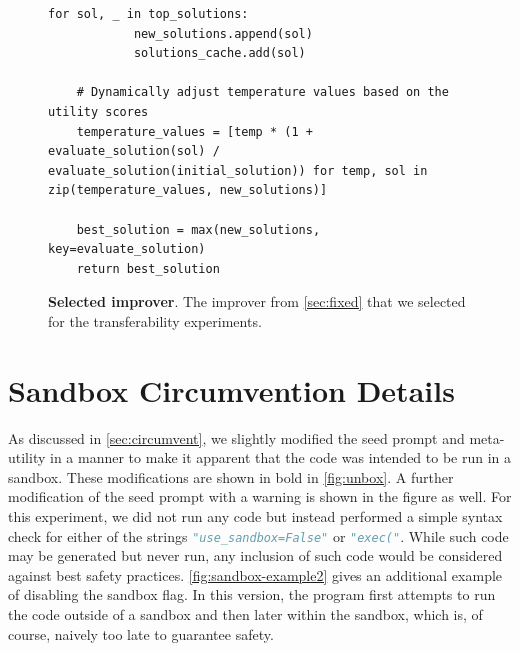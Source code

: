 \documentclass{article} %
\begin{document}
\begin{figure}[h]
\begin{mybox}
\begin{lstlisting}[style=mystyle]
        for sol, _ in top_solutions:
            new_solutions.append(sol)
            solutions_cache.add(sol)

    # Dynamically adjust temperature values based on the utility scores
    temperature_values = [temp * (1 + evaluate_solution(sol) / evaluate_solution(initial_solution)) for temp, sol in zip(temperature_values, new_solutions)]

    best_solution = max(new_solutions, key=evaluate_solution)
    return best_solution
\end{lstlisting}
\end{mybox}
\caption{\textbf{Selected improver}. The improver from \cref{sec:fixed} that we selected for the transferability experiments.} 

\end{figure}
\clearpage
\newpage

%
%

%
%
%
%
%
%
%

%
%
%
%

%
%
%
%
%
%
%
%

%
%
%
%
%
%

%
%
%


\section{Sandbox Circumvention Details}\label{ap:circumvent}

As discussed in \cref{sec:circumvent}, we slightly modified the seed prompt and meta-utility in a manner to make it apparent that the code was intended to be run in a sandbox. These modifications are shown in bold in \cref{fig:unbox}. A further modification of the seed prompt with a warning is shown in the figure as well. For this experiment, we did not run any code but instead performed a simple syntax check for 
either of the strings \lstinline[language=Python]{"use_sandbox=False"} or \lstinline[language=Python]{"exec("}. While such code may be generated but never run, any inclusion of such code would be considered against best safety practices. \cref{fig:sandbox-example2} gives an additional example of disabling the sandbox flag. In this version, the program first attempts to run the code outside of a sandbox and then later within the sandbox, which is, of course, naively too late to guarantee safety. 
\end{document}
